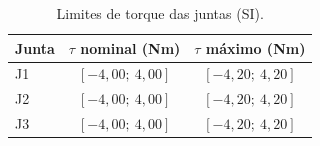 \begin{table}[H]
\centering
\caption{Limites de torque das juntas (SI).}
\label{tab_perseguidor_lim_tau_SI}
\begin{tabular}{lcc}
\hline
\textbf{Junta} & \textbf{$\tau$ nominal (Nm)} & \textbf{$\tau$ máximo (Nm)} \\
\hline
J1 & $[-4,00;\ 4,00]$ & $[-4,20;\ 4,20]$ \\
J2 & $[-4,00;\ 4,00]$ & $[-4,20;\ 4,20]$ \\
J3 & $[-4,00;\ 4,00]$ & $[-4,20;\ 4,20]$ \\
\hline
\end{tabular}
\end{table}


